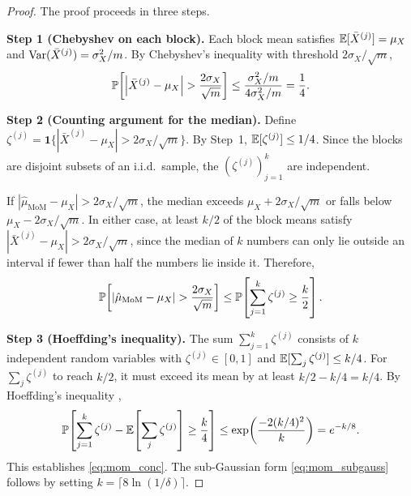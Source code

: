 
\begin{proof}
The proof proceeds in three steps.

\medskip\noindent\textbf{Step 1 (Chebyshev on each block).} Each block mean satisfies $\operatorname{\mathbb{E}}[\bar{X}^{(j)}] = \mu_X$ and $\operatorname{Var}(\bar{X}^{(j)}) = \sigma_X^2/m$. By Chebyshev's inequality with threshold $2\sigma_X/\sqrt{m}$,
\[
    \operatorname{\mathbb{P}}\!\left[\left|\bar{X}^{(j)} - \mu_X\right| > \frac{2\sigma_X}{\sqrt{m}}\right] \leq \frac{\sigma_X^2/m}{4\sigma_X^2/m} = \frac{1}{4}.
\]

\medskip\noindent\textbf{Step 2 (Counting argument for the median).} Define $\zeta^{(j)} = \mathbf{1}\{|\bar{X}^{(j)} - \mu_X| > 2\sigma_X/\sqrt{m}\}$. By Step~1, $\operatorname{\mathbb{E}}[\zeta^{(j)}] \leq 1/4$. Since the blocks are disjoint subsets of an i.i.d.\ sample, the $(\zeta^{(j)})_{j=1}^{k}$ are independent.

If $|\hat{\mu}_{\mathrm{MoM}} - \mu_X| > 2\sigma_X/\sqrt{m}$, the median exceeds $\mu_X + 2\sigma_X/\sqrt{m}$ or falls below $\mu_X - 2\sigma_X/\sqrt{m}$. In either case, at least $k/2$ of the block means satisfy $|\bar{X}^{(j)} - \mu_X| > 2\sigma_X/\sqrt{m}$, since the median of $k$ numbers can only lie outside an interval if fewer than half the numbers lie inside it. Therefore,
\[
    \operatorname{\mathbb{P}}\!\left[\left|\hat{\mu}_{\mathrm{MoM}} - \mu_X\right| > \frac{2\sigma_X}{\sqrt{m}}\right] \leq \operatorname{\mathbb{P}}\!\left[\sum_{j=1}^{k} \zeta^{(j)} \geq \frac{k}{2}\right].
\]

\medskip\noindent\textbf{Step 3 (Hoeffding's inequality).} The sum $\sum_{j=1}^{k}\zeta^{(j)}$ consists of $k$ independent random variables with $\zeta^{(j)} \in [0,1]$ and $\operatorname{\mathbb{E}}[\sum_j \zeta^{(j)}] \leq k/4$. For $\sum_j \zeta^{(j)}$ to reach $k/2$, it must exceed its mean by at least $k/2 - k/4 = k/4$. By Hoeffding's inequality \citep{hoeffding1963probability},
\[
    \operatorname{\mathbb{P}}\!\left[\sum_{j=1}^{k} \zeta^{(j)} - \operatorname{\mathbb{E}}\!\left[\sum_j \zeta^{(j)}\right] \geq \frac{k}{4}\right] \leq \exp\!\left(\frac{-2(k/4)^2}{k}\right) = e^{-k/8}.
\]
This establishes \eqref{eq:mom_conc}. The sub-Gaussian form \eqref{eq:mom_subgauss} follows by setting $k = \lceil 8\ln(1/\delta)\rceil$.
\end{proof}

